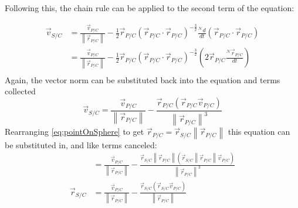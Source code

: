 \documentclass{UoNMCHA}
\newcommand{\norm}[1]{\left\lVert#1\right\rVert}
\numberwithin{equation}{section}
\begin{document}
Following this, the chain rule can be applied to the second term of the equation:

\begin{equation}
	\begin{split}
		\vec{v}_{S/C} &=\frac{\vec{v}_{P/C}}{\norm{\vec{r}_{P/C}}} - \frac{1}{2} \vec{r}_{P/C}(\vec{r}_{P/C}\cdot\vec{r}_{P/C})^{-\frac{3}{2}}\frac{{}^\mathcal{N}d}{dt}(\vec{r}_{P/C} \cdot \vec{r}_{P/C})\\
		&=\frac{\vec{v}_{P/C}}{\norm{\vec{r}_{P/C}}} - \frac{1}{2} \vec{r}_{P/C}(\vec{r}_{P/C}\cdot\vec{r}_{P/C})^{-\frac{3}{2}}\left(2\vec{r}_{P/C}\frac{{}^\mathcal{N}\vec{r}_{P/C}}{dt}\right)\\
	\end{split}
\end{equation}
Again, the vector norm can be substituted back into the equation and terms collected
\begin{equation}
	\vec{v}_{S/C} =\frac{\vec{v}_{P/C}}{\norm{\vec{r}_{P/C}}} - \frac{\vec{r}_{P/C}(\vec{r}_{P/C}\vec{v}_{P/C})}{\norm{\vec{r}_{P/C}}^{3}}
\end{equation}
Rearranging \cref{eq:pointOnSphere} to get $\vec{r}_{P/C} = \vec{r}_{S/C} \norm{\vec{r}_{P/C}}$ this equation can be substituted in, and like terms canceled:
\begin{equation}
	\begin{split}
		&=\frac{\vec{v}_{P/C}}{\norm{\vec{r}_{P/C}}} - \frac{\vec{r}_{S/C}\norm{\vec{r}_{P/C}}(\vec{r}_{S/C}\norm{\vec{r}_{P/C}}\vec{v}_{P/C})}{\norm{\vec{r}_{P/C}}^{3}}\\
		\vec{r}_{S/C}&=\frac{\vec{v}_{P/C}}{\norm{\vec{r}_{P/C}}} - \frac{\vec{r}_{S/C}(\vec{r}_{S/C}\vec{v}_{P/C})}{\norm{\vec{r}_{P/C}}}
	\end{split}
\end{equation}
\end{document}
